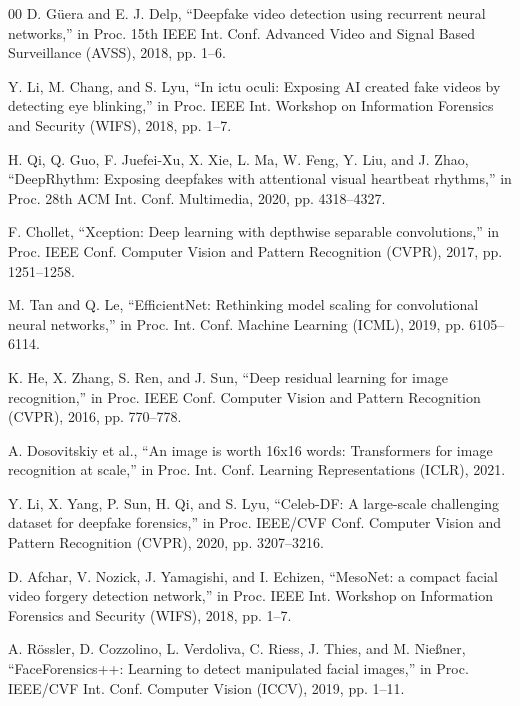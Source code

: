 \documentclass[conference]{IEEEtran}
\begin{document}
\begin{thebibliography}{00}
 D. Güera and E. J. Delp, ``Deepfake video detection using recurrent neural networks,'' in Proc. 15th IEEE Int. Conf. Advanced Video and Signal Based Surveillance (AVSS), 2018, pp. 1--6.

 Y. Li, M. Chang, and S. Lyu, ``In ictu oculi: Exposing AI created fake videos by detecting eye blinking,'' in Proc. IEEE Int. Workshop on Information Forensics and Security (WIFS), 2018, pp. 1--7.

 H. Qi, Q. Guo, F. Juefei-Xu, X. Xie, L. Ma, W. Feng, Y. Liu, and J. Zhao, ``DeepRhythm: Exposing deepfakes with attentional visual heartbeat rhythms,'' in Proc. 28th ACM Int. Conf. Multimedia, 2020, pp. 4318--4327.

 F. Chollet, ``Xception: Deep learning with depthwise separable convolutions,'' in Proc. IEEE Conf. Computer Vision and Pattern Recognition (CVPR), 2017, pp. 1251--1258.

 M. Tan and Q. Le, ``EfficientNet: Rethinking model scaling for convolutional neural networks,'' in Proc. Int. Conf. Machine Learning (ICML), 2019, pp. 6105--6114.

 K. He, X. Zhang, S. Ren, and J. Sun, ``Deep residual learning for image recognition,'' in Proc. IEEE Conf. Computer Vision and Pattern Recognition (CVPR), 2016, pp. 770--778.

 A. Dosovitskiy et al., ``An image is worth 16x16 words: Transformers for image recognition at scale,'' in Proc. Int. Conf. Learning Representations (ICLR), 2021.

 Y. Li, X. Yang, P. Sun, H. Qi, and S. Lyu, ``Celeb-DF: A large-scale challenging dataset for deepfake forensics,'' in Proc. IEEE/CVF Conf. Computer Vision and Pattern Recognition (CVPR), 2020, pp. 3207--3216.

 D. Afchar, V. Nozick, J. Yamagishi, and I. Echizen, ``MesoNet: a compact facial video forgery detection network,'' in Proc. IEEE Int. Workshop on Information Forensics and Security (WIFS), 2018, pp. 1--7.

 A. Rössler, D. Cozzolino, L. Verdoliva, C. Riess, J. Thies, and M. Nießner, ``FaceForensics++: Learning to detect manipulated facial images,'' in Proc. IEEE/CVF Int. Conf. Computer Vision (ICCV), 2019, pp. 1--11.


\end{thebibliography}
\end{document}
